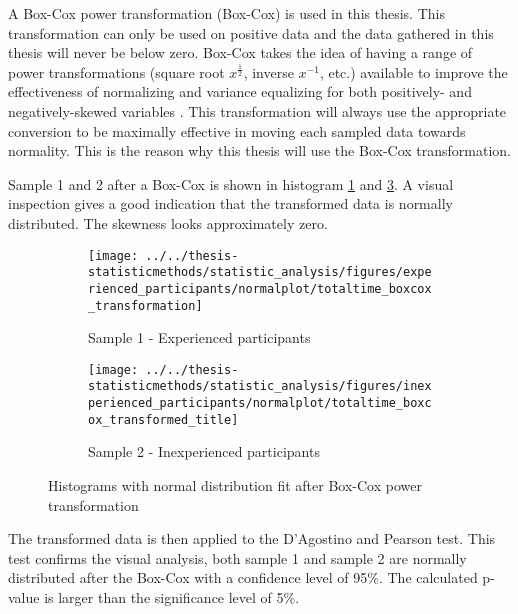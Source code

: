 A Box-Cox power transformation (Box-Cox) is used in this thesis. This transformation can only be used on positive data and the data gathered in this thesis will never be below zero. Box-Cox takes the idea of having a range of power transformations (square root $x^{\frac{1}{2}}$, inverse $x^{-1}$, etc.) available to improve the effectiveness of normalizing and variance equalizing for both positively- and negatively-skewed variables \citep{Osborne2010}. This transformation will always use the appropriate conversion to be maximally effective in moving each sampled data towards normality. This is the reason why this thesis will use the Box-Cox transformation.

Sample 1 and 2 after a Box-Cox is shown in histogram \ref{fig:totaltimeboxcoxtransformation_experienced} and \ref{fig:totaltimeboxcoxtransformedtitle_inexperienced}. A visual inspection gives a good indication that the transformed data is normally distributed. The skewness looks approximately zero.

\begin{figure}[H]
	\centering
	\begin{subfigure}[b]{0.48\textwidth}
		\centering
		\texttt{[image: ../../thesis-statisticmethods/statistic\_analysis/figures/experienced\_participants/normalplot/totaltime\_boxcox\_transformation]}
		\caption[Experienced, Box-Cox]{Sample 1 - Experienced participants}
		\label{fig:totaltimeboxcoxtransformation_experienced}
	\end{subfigure}
	\begin{subfigure}[b]{0.48\textwidth}
		\centering
		\texttt{[image: ../../thesis-statisticmethods/statistic\_analysis/figures/inexperienced\_participants/normalplot/totaltime\_boxcox\_transformed\_title]}
		\caption[Inexperienced, Box-Cox]{Sample 2 - Inexperienced participants}
		\label{fig:totaltimeboxcoxtransformedtitle_inexperienced}
	\end{subfigure}
\caption{Histograms with normal distribution fit after Box-Cox power transformation}
\end{figure}

The transformed data is then applied to the D'Agostino and Pearson test. This test confirms the visual analysis, both sample 1 and sample 2 are normally distributed after the Box-Cox with a confidence level of 95\%. The calculated p-value is larger than the significance level of 5\%. \\[0.5cm] 

